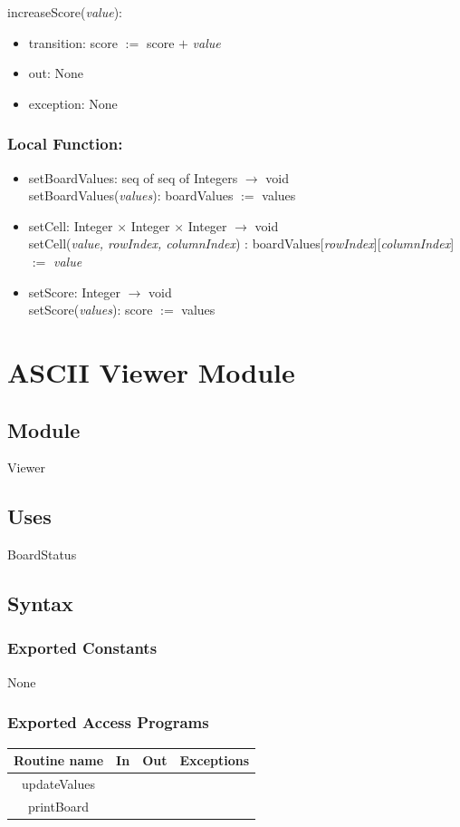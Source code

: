 \documentclass{article}
\begin{document}
increaseScore(\textit{value}):
\begin{itemize}
    \item transition: score $:= $ score $+$ \textit{value}
    \item out: None
    \item exception: None
\end{itemize}

\subsubsection*{Local Function:}
\begin{itemize}
    

\item setBoardValues: seq of seq of Integers $\rightarrow$ void \\
setBoardValues(\textit{values}): boardValues $:=$ values \\
\item setCell: Integer $\times$ Integer $\times$ Integer $\rightarrow$ void \\
setCell(\textit{value, rowIndex, columnIndex}) : boardValues[\textit{rowIndex}][\textit{columnIndex}] $:= $ \textit{value} \\
\item setScore: Integer $\rightarrow$ void \\
setScore(\textit{values}): score $:=$ values \\

\end{itemize}
\newpage
\section*{ASCII Viewer Module}
\subsection*{Module}
Viewer
\subsection*{Uses}
BoardStatus

\subsection*{Syntax}
\subsubsection*{Exported Constants}
None
\subsubsection*{Exported Access Programs}
\begin{tabular}{ | c | c | c | c | }
        \hline 
    
          \textbf{Routine name} & \textbf{In} & \textbf{Out} & \textbf{Exceptions}\\
          \hline 
          updateValues & &  & \\\hline
          printBoard & & & \\ \hline
          
         
\end{tabular}
\end{document}
